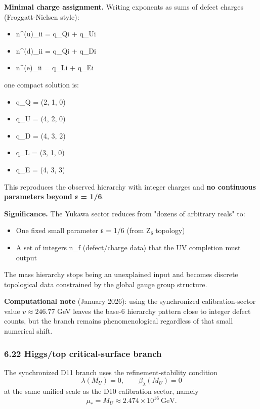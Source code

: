 \textbf{Minimal charge assignment.} Writing exponents as sums of defect charges (Froggatt-Nielsen style):

\begin{itemize}
\tightlist
\item
  n\^{}(u)\_ii = q\_Qi + q\_Ui
\item
  n\^{}(d)\_ii = q\_Qi + q\_Di
\item
  n\^{}(e)\_ii = q\_Li + q\_Ei
\end{itemize}

one compact solution is:

\begin{itemize}
\tightlist
\item
  q\_Q = (2, 1, 0)
\item
  q\_U = (4, 2, 0)
\item
  q\_D = (4, 3, 2)
\item
  q\_L = (3, 1, 0)
\item
  q\_E = (4, 3, 3)
\end{itemize}

This reproduces the observed hierarchy with integer charges and \textbf{no continuous parameters beyond ε = 1/6}.

\textbf{Significance.} The Yukawa sector reduces from "dozens of arbitrary reals" to:

\begin{itemize}
\tightlist
\item
  One fixed small parameter ε = 1/6 (from Z₆ topology)
\item
  A set of integers n\_f (defect/charge data) that the UV completion must output
\end{itemize}

The mass hierarchy stops being an unexplained input and becomes discrete topological data constrained by the global gauge group structure.

\textbf{Computational note} (January 2026): using the synchronized calibration-sector value \(v\approx 246.77\) GeV leaves the base-6 hierarchy pattern close to integer defect counts, but the branch remains phenomenological regardless of that small numerical shift.

\subsubsection{6.22 Higgs/top critical-surface branch}\label{622-higgs-mass-from-critical-surface-constraint}

The synchronized D11 branch uses the refinement-stability condition
\[
\lambda(M_U)=0,\qquad \beta_\lambda(M_U)=0
\]
at the same unified scale as the D10 calibration sector, namely
\[
\mu_* = M_U \approx 2.474 \times 10^{16}\ \mathrm{GeV}.
\]

